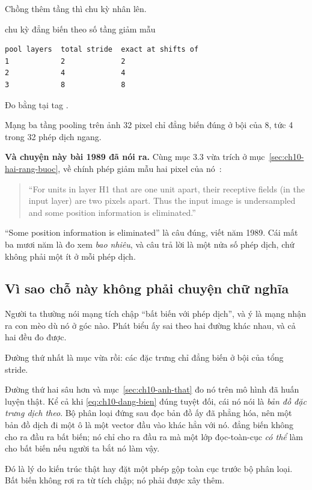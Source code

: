 Chồng thêm tầng thì chu kỳ nhân lên.

\begin{measured}{chu kỳ đẳng biến theo số tầng giảm mẫu}
\begin{verbatim}
pool layers  total stride  exact at shifts of
1            2             2
2            4             4
3            8             8
\end{verbatim}

Đo bằng  tại tag .
\end{measured}

Mạng ba tầng pooling trên ảnh 32 pixel chỉ đẳng biến đúng ở bội của 8, tức 4
trong 32 phép dịch ngang.

\textbf{Và chuyện này bài 1989 đã nói ra.} Cùng mục 3.3 vừa trích ở
mục~\ref{sec:ch10-hai-rang-buoc}, về chính phép giảm mẫu hai pixel của
nó~\autocite{lecun1989zipcode}:

\begin{quote}
\enquote{For units in layer H1 that are one unit apart, their receptive fields
(in the input layer) are two pixels apart. Thus the input image is undersampled
and some position information is eliminated.}
\end{quote}

\enquote{Some position information is eliminated} là câu đúng, viết năm 1989.
Cái mất ba mươi năm là đo xem \emph{bao nhiêu}, và câu trả lời là một nửa số
phép dịch, chứ không phải một ít ở mỗi phép dịch.

\subsection*{Vì sao chỗ này không phải chuyện chữ nghĩa}

%
Người ta thường nói mạng tích chập \enquote{bất biến với phép dịch}, và ý là
mạng nhận ra con mèo dù nó ở góc nào. Phát biểu ấy sai theo hai đường khác
nhau, và cả hai đều đo được.

Đường thứ nhất là mục vừa rồi: các đặc trưng chỉ đẳng biến ở bội của tổng
stride.

Đường thứ hai sâu hơn và mục~\ref{sec:ch10-anh-that} đo nó trên mô hình đã
huấn luyện thật. Kể cả khi \eqref{eq:ch10-dang-bien} đúng tuyệt đối, cái nó nói
là \emph{bản đồ đặc trưng dịch theo}. Bộ phân loại đứng sau đọc bản đồ ấy đã
phẳng hóa, nên một bản đồ dịch đi một ô là một vector đầu vào khác hẳn với nó.
 đẳng biến không cho ra đầu ra bất biến; nó
chỉ cho ra đầu ra mà một lớp đọc-toàn-cục \emph{có thể} làm cho bất biến nếu
người ta bắt nó làm vậy.

Đó là lý do kiến trúc thật hay đặt một phép gộp toàn cục trước bộ phân loại.
Bất biến không rơi ra từ tích chập; nó phải được xây thêm.

